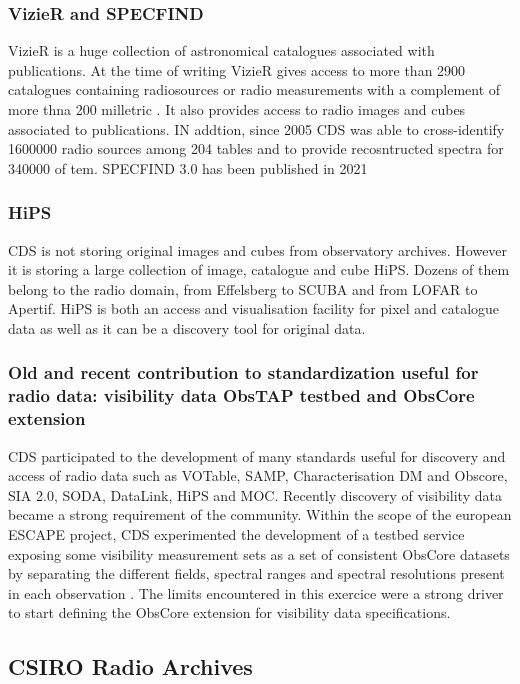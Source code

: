\documentclass[11pt,a4paper]{ivoatex/ivoa}
\begin{document}
{\subsubsection{VizieR and SPECFIND}

VizieR is a huge collection of astronomical  catalogues associated with publications. At the time of writing VizieR gives access to more than 2900 catalogues containing radiosources or radio measurements with a complement of more thna 200 milletric . It also provides access to radio images and cubes associated to publications. IN addtion, since 2005 CDS was able to cross-identify 1600000 radio sources among 204 tables and to provide recosntructed spectra for 340000 of tem. SPECFIND 3.0 has been published in 2021 \citep{2020yCat.8104....0S}   


\subsubsection{HiPS}
CDS is not storing original images and cubes from observatory archives. However it is storing  a large collection of image, catalogue and cube HiPS. Dozens of them belong to the radio domain, from Effelsberg to SCUBA and from LOFAR to Apertif. HiPS is both an access and visualisation facility for pixel and catalogue data as well as it can be a discovery tool for original data. 

\subsubsection{Old and recent contribution to standardization useful for radio data: visibility data ObsTAP testbed and ObsCore extension }

CDS participated to the development of many standards useful for discovery and access of radio data such as VOTable, SAMP, Characterisation DM and Obscore, SIA 2.0, SODA, DataLink, HiPS and MOC. 
Recently discovery of visibility data became a strong requirement of the community. Within the scope of the european ESCAPE project, CDS experimented the development of a testbed service exposing some visibility measurement sets as a set of consistent ObsCore datasets by separating the different fields, spectral ranges and spectral resolutions present in each observation \citep{2020arXiv201209273L}. The limits encountered in this exercice were a strong driver to start defining the ObsCore extension for  visibility data specifications.


\subsection{CSIRO Radio Archives}\label{sec:CASDA}

}
\end{document}
